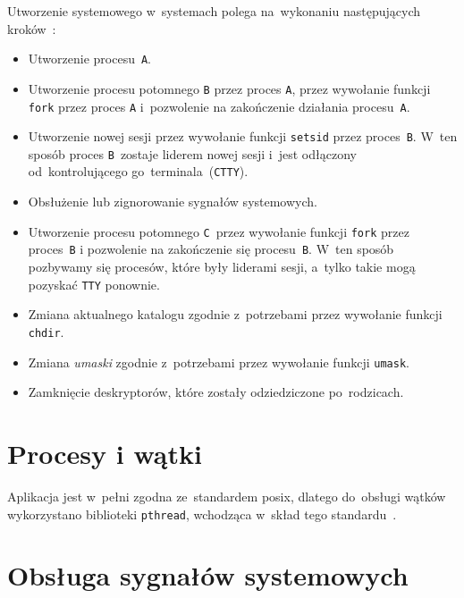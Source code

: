 \documentclass[thesis]{subfiles}
\begin{document}
\noindent Utworzenie \emph{} systemowego w~systemach  polega na~wykonaniu następujących kroków~\cite{creating-daemon-stackoverflow}:
\begin{itemize}
	\item Utworzenie procesu~\texttt{A}.
	\item Utworzenie procesu potomnego \texttt{B} przez proces \texttt{A}, przez wywołanie funkcji \texttt{fork} przez proces \texttt{A} i~pozwolenie na zakończenie działania procesu~\texttt{A}.
	\item Utworzenie nowej sesji przez wywołanie funkcji \texttt{setsid} przez proces~\texttt{B}. W~ten sposób proces \texttt{B}~zostaje liderem nowej sesji i~jest odłączony od~kontrolującego go~terminala~(\texttt{CTTY}).
	\item Obsłużenie lub zignorowanie sygnałów systemowych.
	\item Utworzenie procesu potomnego \texttt{C}~przez wywołanie funkcji \texttt{fork} przez proces~\texttt{B} i pozwolenie na zakończenie się procesu~\texttt{B}. W~ten sposób pozbywamy się procesów, które były liderami sesji, a~tylko takie mogą pozyskać \texttt{TTY} ponownie.
	\item Zmiana aktualnego katalogu zgodnie z~potrzebami przez wywołanie funkcji \texttt{chdir}.
	\item Zmiana \emph{umaski} zgodnie z~potrzebami przez wywołanie funkcji \texttt{umask}.
	\item Zamknięcie deskryptorów, które zostały odziedziczone po~rodzicach.
\end{itemize}


\section{Procesy i wątki}

Aplikacja jest w~pełni zgodna ze~standardem \gls{posix}, dlatego do~obsługi wątków wykorzystano biblioteki \texttt{pthread}, wchodząca w~skład tego standardu~\cite{pthreads-posix-manual}.


\section{Obsługa sygnałów systemowych}
\end{document}
